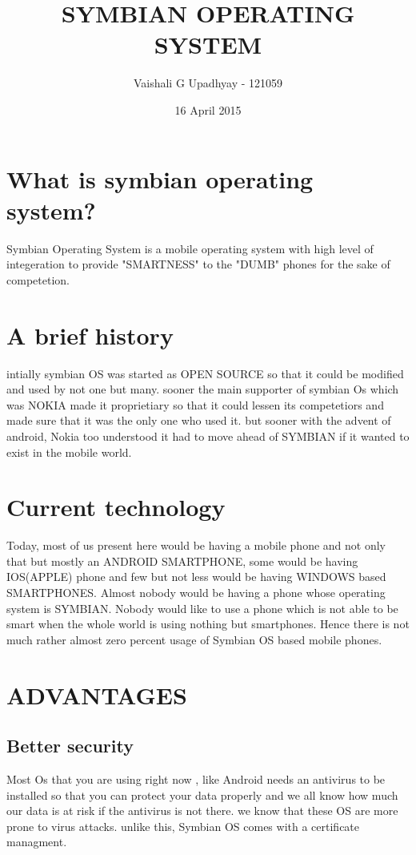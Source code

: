 \documentclass[a4paper,11pt]{article}
\begin{document}
\author{Vaishali G Upadhyay - 121059  }
\title{SYMBIAN OPERATING SYSTEM}
\date{16 April 2015} 
\maketitle{} %
\tableofcontents{} %

\section{What is symbian operating system?}
Symbian Operating System is a mobile operating system with high level of integeration to provide  "SMARTNESS" to the "DUMB" phones for the sake of competetion.
\section{A brief history}
intially symbian OS was started as OPEN SOURCE so that it could be modified and used by not one but many. sooner the main supporter of symbian Os which was NOKIA made it proprietiary so that it could lessen its competetiors and made sure that it was the only one who used it. but sooner with the advent of android, Nokia too understood it had to move ahead of SYMBIAN if it wanted to exist in the mobile world.
\section{Current technology}
Today, most of us present here would be having a mobile phone and not only that but mostly an ANDROID SMARTPHONE, some would be having IOS(APPLE) phone and few but not less would be having WINDOWS based SMARTPHONES. Almost nobody would be having a phone whose operating system is SYMBIAN. Nobody would like to use a phone which is not able to be smart when the whole world is using nothing but smartphones. Hence there is not much rather almost zero percent usage of Symbian OS based mobile phones.

\section{ADVANTAGES}
\subsection{Better security}
Most Os that you are using right now , like Android needs an antivirus to be installed so that you can protect your data properly and we all know how much our data is at risk if the antivirus is not there. we know that these OS are more prone to virus attacks. unlike this, Symbian OS comes with a certificate managment.
\end{document}
